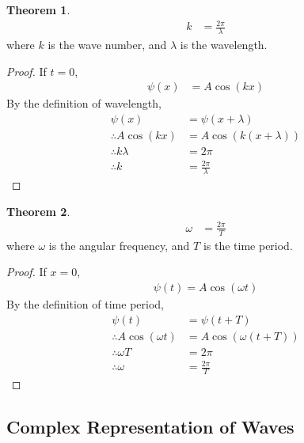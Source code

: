 \documentclass[titlepage, fleqn, a4paper, 12pt, twoside]{article}
\theoremstyle{definition}
\theoremstyle{theorem}
\newtheorem{theorem}{Theorem}
\let\Oldsubsection\subsection
\renewcommand{\subsection}{\FloatBarrier\Oldsubsection}
\begin{document}
\begin{theorem}
	\begin{align*}
		k & = \frac{2 \pi}{\lambda}
	\end{align*}
	where $k$ is the wave number, and $\lambda$ is the wavelength.
\end{theorem}

\begin{proof}
	If $t = 0$,
	\begin{align*}
		\psi(x) & = A \cos(k x)
	\end{align*}
	By the definition of wavelength,
	\begin{align*}
		\psi(x)                & = \psi(x + \lambda)                    \\
		\therefore A \cos(k x) & = A \cos\left( k (x + \lambda) \right) \\
		\therefore k \lambda   & = 2 \pi                                \\
		\therefore k           & = \frac{2 \pi}{\lambda}
	\end{align*}
\end{proof}

\begin{theorem}
	\begin{align*}
		\omega & = \frac{2 \pi}{T}
	\end{align*}
	where $\omega$ is the angular frequency, and $T$ is the time period.
\end{theorem}

\begin{proof}
	If $x = 0$,
	\begin{align*}
		\psi(t) = A \cos(\omega t)
	\end{align*}
	By the definition of time period,
	\begin{align*}
		\psi(t)                     & = \psi(t + T)                         \\
		\therefore A \cos(\omega t) & = A \cos\left( \omega (t + T) \right) \\
		\therefore \omega T         & = 2 \pi                               \\
		\therefore \omega           & = \frac{2 \pi}{T}
	\end{align*}
\end{proof}

\subsection{Complex Representation of Waves}
\end{document}
